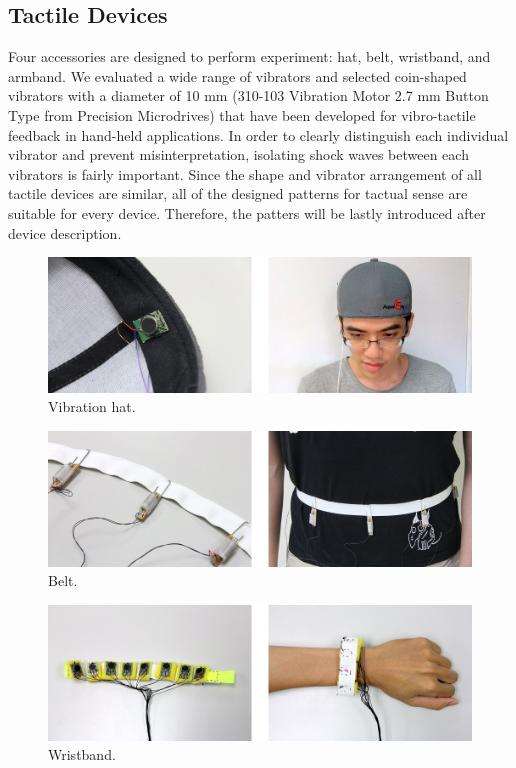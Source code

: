\documentclass{sigchi}
\begin{document}
\subsection{Tactile Devices}
Four accessories are designed to perform experiment: hat, belt, wristband, and armband. 
We evaluated a wide range of vibrators and selected coin-shaped vibrators with a diameter of 10 mm (310-103 Vibration Motor 2.7 mm Button Type from Precision Microdrives) that have been developed for vibro-tactile feedback in hand-held applications. In order to clearly distinguish each individual vibrator and prevent misinterpretation, isolating shock waves between each vibrators is fairly important. Since the shape and vibrator arrangement of all tactile devices are similar, all of the designed patterns for tactual sense are suitable for every device. Therefore, the patters will be lastly introduced after device description.

\begin{figure}[!b]
\centering
\includegraphics[width=0.9\columnwidth]{hat_4}
\caption{Vibration hat.}
\label{fig:hat}
\end{figure}

\begin{figure}[!b]
\centering
\includegraphics[width=0.9\columnwidth]{belt_4}
\caption{Belt.}
\label{fig:belt}
\end{figure}

\begin{figure}[!b]
\centering
\includegraphics[width=0.9\columnwidth]{wristband_4}
\caption{Wristband.}
\label{fig:wristband}
\end{figure}
\end{document}
